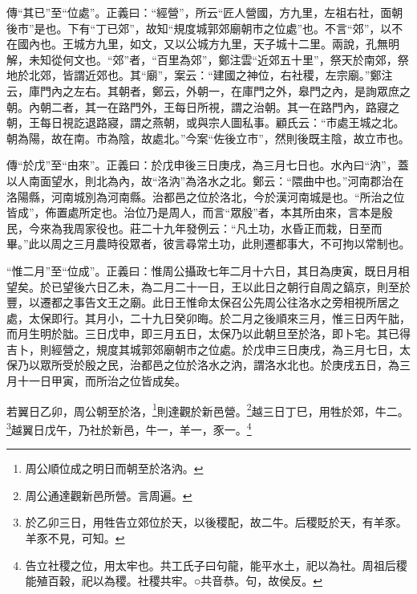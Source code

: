 {\noindent\zhuan{}\fzbyks 傳“其已”至“位處”。正義曰：“經營”，所云“匠人營國，方九里，左祖右社，面朝後市”是也。下有“丁已郊”，故知“規度城郭郊廟朝市之位處”也。不言“郊”，以不在國內也。王城方九里，如文，又以公城方九里，天子城十二里。兩說，孔無明解，未知從何文也。“郊”者，“百里為郊”，鄭注雲“近郊五十里”，祭天於南郊，祭地於北郊，皆謂近郊也。其“廟”，案云：“建國之神位，右社稷，左宗廟。”鄭注云，庫門內之左右。其朝者，鄭云，外朝一，在庫門之外，皋門之內，是詢眾庶之朝。內朝二者，其一在路門外，王每日所視，謂之治朝。其一在路門內，路寢之朝，王每日視訖退路寢，謂之燕朝，或與宗人圖私事。顧氏云：“市處王城之北。朝為陽，故在南。市為陰，故處北。”今案“佐後立市”，然則後既主陰，故立市也。 \par}

{\noindent\zhuan{}\fzbyks 傳“於戊”至“由來”。正義曰：於戊申後三日庚戌，為三月七日也。水內曰“汭”，蓋以人南面望水，則北為內，故“洛汭”為洛水之北。鄭云：“隈曲中也。”河南郡治在洛陽縣，河南城別為河南縣。治都邑之位於洛北，今於漢河南城是也。“所治之位皆成”，佈置處所定也。治位乃是周人，而言“眾殷”者，本其所由來，言本是殷民，今來為我周家役也。莊二十九年發例云：“凡土功，水昏正而栽，日至而畢。”此以周之三月農時役眾者，彼言尋常土功，此則遷都事大，不可拘以常制也。 \par}

{\noindent\shu{}\fzkt “惟二月”至“位成”。正義曰：惟周公攝政七年二月十六日，其日為庚寅，既日月相望矣。於已望後六日乙未，為二月二十一日，王以此日之朝行自周之鎬京，則至於豐，以遷都之事告文王之廟。此日王惟命太保召公先周公往洛水之旁相視所居之處，太保即行。其月小，二十九日癸卯晦。於二月之後順來三月，惟三日丙午朏，而月生明於朏。三日戊申，即三月五日，太保乃以此朝旦至於洛，即卜宅。其已得吉卜，則經營之，規度其城郭郊廟朝市之位處。於戊申三日庚戌，為三月七日，太保乃以眾所受於殷之民，治都邑之位於洛水之汭，謂洛水北也。於庚戌五日，為三月十一日甲寅，而所治之位皆成矣。 \par}

若翼日乙卯，周公朝至於洛，\footnote{周公順位成之明日而朝至於洛汭。}則達觀於新邑營。\footnote{周公通達觀新邑所營。言周遍。}越三日丁巳，用牲於郊，牛二。\footnote{於乙卯三日，用牲告立郊位於天，以後稷配，故二牛。后稷貶於天，有羊豕。羊豕不見，可知。}越翼日戊午，乃社於新邑，牛一，羊一，豕一。\footnote{告立社稷之位，用太牢也。共工氏子曰句龍，能平水土，祀以為社。周祖后稷能殖百穀，祀以為稷。社稷共牢。○共音恭。句，故侯反。}


